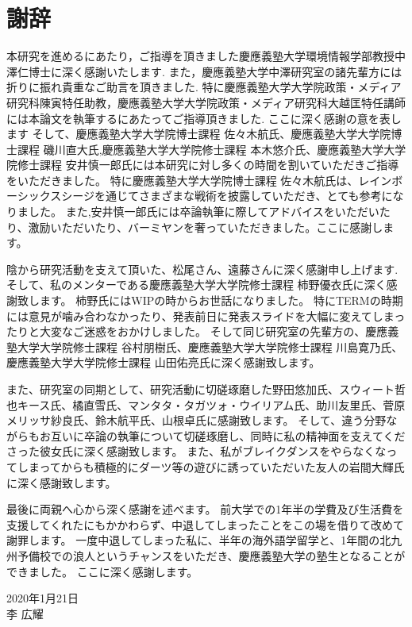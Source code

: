 \chapter*{謝辞}
本研究を進めるにあたり，ご指導を頂きました慶應義塾大学環境情報学部教授中澤仁博士に深く感謝いたします.
また，慶應義塾大学中澤研究室の諸先輩方には折りに振れ貴重なご助言を頂きました.
特に慶應義塾大学大学院政策・メディア研究科陳寅特任助教，慶應義塾大学大学院政策・メディア研究科大越匡特任講師には本論文を執筆するにあたってご指導頂きました.
ここに深く感謝の意を表します
そして、慶應義塾大学大学院博士課程 佐々木航氏、慶應義塾大学大学院博士課程 磯川直大氏,慶應義塾大学大学院修士課程 本木悠介氏、慶應義塾大学大学院修士課程 安井慎一郎氏には本研究に対し多くの時間を割いていただきご指導をいただきました。
特に慶應義塾大学大学院博士課程 佐々木航氏は、レインボーシックスシージを通じてさまざまな戦術を披露していただき、とても参考になりました。
また,安井慎一郎氏には卒論執筆に際してアドバイスをいただいたり、激励いただいたり、バーミヤンを奢っていただきました。ここに感謝します。

陰から研究活動を支えて頂いた、松尾さん、遠藤さんに深く感謝申し上げます.
そして、私のメンターである慶應義塾大学大学院修士課程 柿野優衣氏に深く感謝致します。
柿野氏にはWIPの時からお世話になりました。
特にTERMの時期には意見が噛み合わなかったり、発表前日に発表スライドを大幅に変えてしまったりと大変なご迷惑をおかけしました。
そして同じ研究室の先輩方の、慶應義塾大学大学院修士課程 谷村朋樹氏、慶應義塾大学大学院修士課程 川島寛乃氏、慶應義塾大学大学院修士課程 山田佑亮氏に深く感謝致します。

また、研究室の同期として、研究活動に切磋琢磨した野田悠加氏、スウィート哲也キース氏、橘直雪氏、マンタタ・タガツォ・ウイリアム氏、助川友里氏、菅原メリッサ紗良氏、鈴木航平氏、山根卓氏に感謝致します。
そして、違う分野ながらもお互いに卒論の執筆について切磋琢磨し、同時に私の精神面を支えてくださった彼女氏に深く感謝致します。
また、私がブレイクダンスをやらなくなってしまってからも積極的にダーツ等の遊びに誘っていただいた友人の岩間大輝氏に深く感謝致します。

最後に両親へ心から深く感謝を述べます。
前大学での1年半の学費及び生活費を支援してくれたにもかかわらず、中退してしまったことをこの場を借りて改めて謝罪します。
一度中退してしまった私に、半年の海外語学留学と、1年間の北九州予備校での浪人というチャンスをいただき、慶應義塾大学の塾生となることができました。
ここに深く感謝します。

\begin{flushright}
2020年1月21日\\
李 広耀
\end{flushright}
